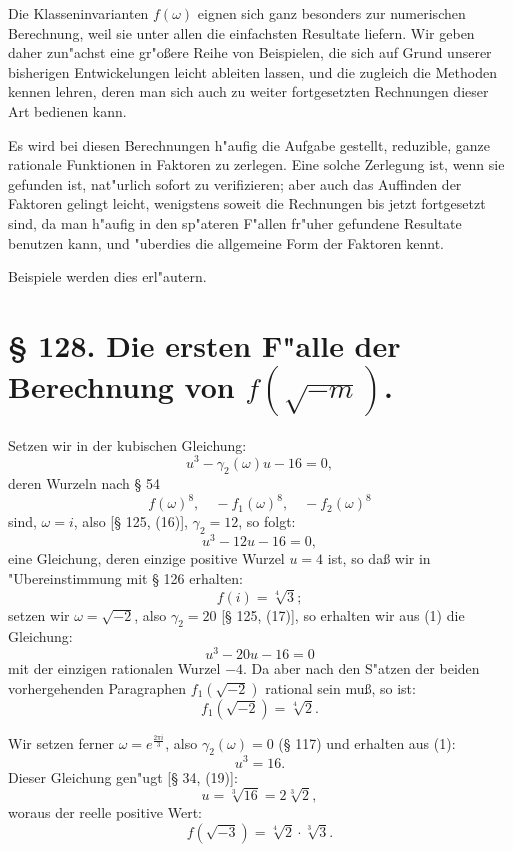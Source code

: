 \documentclass[12pt,a4paper]{article}
\theoremstyle{plain}
\theoremstyle{definition}
\theoremstyle{remark}
\begin{document}
Die Klasseninvarianten $f(\omega)$ eignen sich ganz besonders zur numerischen Berechnung, weil sie unter allen die einfachsten Resultate liefern. Wir geben daher zun"achst eine gr"o\ss{}ere Reihe von Beispielen, die sich auf Grund unserer bisherigen Entwickelungen leicht ableiten lassen, und die zugleich die Methoden kennen lehren, deren man sich auch zu weiter fortgesetzten Rechnungen dieser Art bedienen kann.

Es wird bei diesen Berechnungen h"aufig die Aufgabe gestellt, reduzible, ganze rationale Funktionen in Faktoren zu zerlegen. Eine solche Zerlegung ist, wenn sie gefunden ist, nat"urlich sofort zu verifizieren; aber auch das Auffinden der Faktoren gelingt leicht, wenigstens soweit die Rechnungen bis jetzt fortgesetzt sind, da man h"aufig in den sp"ateren F"allen fr"uher gefundene Resultate benutzen kann, und "uberdies die allgemeine Form der Faktoren kennt.

Beispiele werden dies erl"autern.

\newpage

\section*{\S{} 128. Die ersten F"alle der Berechnung von $f(\sqrt{-m})$.}

Setzen wir in der kubischen Gleichung:
\begin{equation}\label{eq:128_1}
u^3 - \gamma_2(\omega) u - 16 = 0,
\end{equation}
deren Wurzeln nach \S{} 54
\[
f(\omega)^8, \quad -f_1(\omega)^8, \quad -f_2(\omega)^8
\]
sind, $\omega = i$, also [\S{} 125, (16)], $\gamma_2 = 12$, so folgt:
\[
u^3 - 12u - 16 = 0,
\]
eine Gleichung, deren einzige positive Wurzel $u = 4$ ist, so da\ss{} wir in "Ubereinstimmung mit \S{} 126 erhalten:
\begin{equation}\label{eq:128_2}
f(i) = \sqrt[4]{3};
\end{equation}
setzen wir $\omega = \sqrt{-2}$, also $\gamma_2 = 20$ [\S{} 125, (17)], so erhalten wir aus (1) die Gleichung:
\[
u^3 - 20u - 16 = 0
\]
mit der einzigen rationalen Wurzel $-4$. Da aber nach den S"atzen der beiden vorhergehenden Paragraphen $f_1(\sqrt{-2})$ rational sein mu\ss{}, so ist:
\begin{equation}\label{eq:128_3}
f_1(\sqrt{-2}) = \sqrt[4]{2}.
\end{equation}

Wir setzen ferner $\omega = e^{\frac{2\pi i}{3}}$, also $\gamma_2(\omega) = 0$ (\S{} 117) und erhalten aus (1):
\[
u^3 = 16.
\]
Dieser Gleichung gen"ugt [\S{} 34, (19)]:
\[
u = \sqrt[3]{16} = 2\sqrt[3]{2},
\]
woraus der reelle positive Wert:
\begin{equation}\label{eq:128_4}
f(\sqrt{-3}) = \sqrt[4]{2} \cdot \sqrt[3]{3}.
\end{equation}
\end{document}
